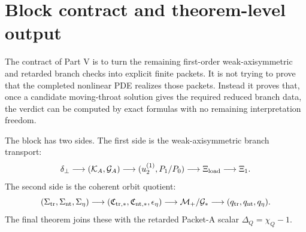
\section{Block contract and theorem-level output}
\label{sec:part05-block-contract}

The contract of Part V is to turn the remaining first-order weak-axisymmetric and retarded branch checks into explicit finite packets.  It is not trying to prove that the completed nonlinear PDE realizes those packets.  Instead it proves that, once a candidate moving-throat solution gives the required reduced branch data, the verdict can be computed by exact formulas with no remaining interpretation freedom.

The block has two sides.  The first side is the weak-axisymmetric branch transport:
\begin{equation}
\label{eq:part05-chain-branch-side}
\delta_\perp
\longrightarrow
(\mathcal K_A,\mathcal G_A)
\longrightarrow
(u_2^{(1)},P_1/P_0)
\longrightarrow
\Xi_{\rm load}
\longrightarrow
\Xi_1.
\end{equation}
The second side is the coherent orbit quotient:
\begin{equation}
\label{eq:part05-chain-orbit-side}
(\Sigma_{\rm tr},\Sigma_{\rm nt},\Sigma_\eta)
\longrightarrow
(\mathfrak C_{{\rm tr},*},\mathfrak C_{{\rm nt},*},\epsilon_\eta)
\longrightarrow
\mathcal M_+/\mathcal G_*
\longrightarrow
(q_{\rm tr},q_{\rm nt},q_\eta).
\end{equation}
The final theorem joins these with the retarded Packet-A scalar \(\Delta_Q=\chi_Q-1\).

